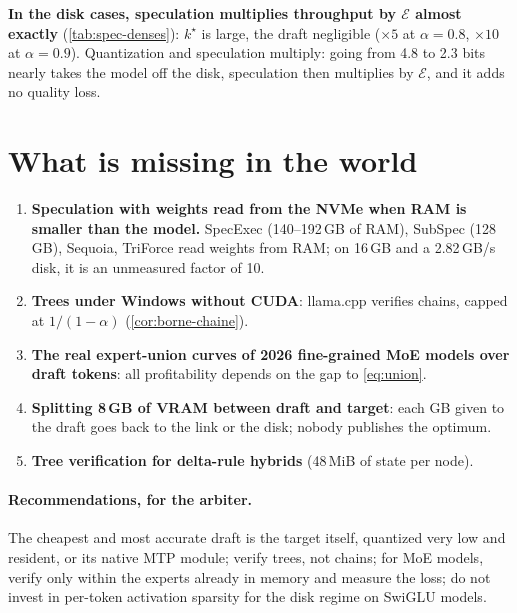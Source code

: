 \textbf{In the disk cases, speculation multiplies throughput by $\mathcal E$ almost exactly} (\cref{tab:spec-denses}): $k^\star$ is large, the draft negligible ($\times5$ at $\alpha = 0.8$, $\times10$ at $\alpha = 0.9$). Quantization and speculation multiply: going from 4.8 to 2.3 bits nearly takes the model off the disk, speculation then multiplies by $\mathcal E$, and it adds no quality loss.

\section{What is missing in the world}

\begin{enumerate}
\item \textbf{Speculation with weights read from the NVMe when RAM is smaller than the model.} SpecExec (140--192\,GB of RAM), SubSpec (128\,GB), Sequoia, TriForce read weights from RAM; on 16\,GB and a 2.82\,GB/s disk, it is an unmeasured factor of 10.
\item \textbf{Trees under Windows without CUDA}: llama.cpp verifies chains, capped at $1/(1-\alpha)$ (\cref{cor:borne-chaine}).
\item \textbf{The real expert-union curves of 2026 fine-grained MoE models over draft tokens}: all profitability depends on the gap to \cref{eq:union}.
\item \textbf{Splitting 8\,GB of VRAM between draft and target}: each GB given to the draft goes back to the link or the disk; nobody publishes the optimum.
\item \textbf{Tree verification for delta-rule hybrids} (48\,MiB of state per node).
\end{enumerate}

\paragraph{Recommendations, for the arbiter.} The cheapest and most accurate draft is the target itself, quantized very low and resident, or its native MTP module; verify trees, not chains; for MoE models, verify only within the experts already in memory and measure the loss; do not invest in per-token activation sparsity for the disk regime on SwiGLU models.

